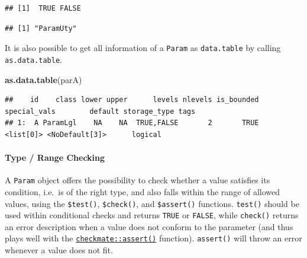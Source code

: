 \documentclass[]{scrbook}
\newenvironment{Shaded}{\begin{snugshade}}{\end{snugshade}}
\newcommand{\KeywordTok}[1]{\textcolor[rgb]{0.13,0.29,0.53}{\textbf{#1}}}
\newcommand{\NormalTok}[1]{#1}
\newcommand{\OperatorTok}[1]{\textcolor[rgb]{0.81,0.36,0.00}{\textbf{#1}}}
\newcommand{\OtherTok}[1]{\textcolor[rgb]{0.56,0.35,0.01}{#1}}
\let\oldparagraph\paragraph
\renewcommand{\paragraph}[1]{\oldparagraph{#1}\mbox{}}
\renewenvironment{Shaded} {\begin{snugshade}\small} {\end{snugshade}}
\begin{document}
\begin{verbatim}
## [1]  TRUE FALSE
\end{verbatim}

\begin{Shaded}
\end{Shaded}

\begin{verbatim}
## [1] "ParamUty"
\end{verbatim}

It is also possible to get all information of a \texttt{Param} as \texttt{data.table} by calling \texttt{as.data.table}.

\begin{Shaded}
\begin{Highlighting}[]
\KeywordTok{as.data.table}\NormalTok{(parA)}
\end{Highlighting}
\end{Shaded}

\begin{verbatim}
##    id    class lower upper      levels nlevels is_bounded special_vals        default storage_type tags
## 1:  A ParamLgl    NA    NA  TRUE,FALSE       2       TRUE    <list[0]> <NoDefault[3]>      logical
\end{verbatim}

\hypertarget{type-range-checking}{%
\paragraph{Type / Range Checking}\label{type-range-checking}}

A \texttt{Param} object offers the possibility to check whether a value satisfies its condition, i.e.~is of the right type, and also falls within the range of allowed values, using the \texttt{\$test()}, \texttt{\$check()}, and \texttt{\$assert()} functions.
\texttt{test()} should be used within conditional checks and returns \texttt{TRUE} or \texttt{FALSE}, while \texttt{check()} returns an error description when a value does not conform to the parameter (and thus plays well with the \href{https://www.rdocumentation.org/packages/checkmate/topics/assert}{\texttt{checkmate::assert()}} function).
\texttt{assert()} will throw an error whenever a value does not fit.

\begin{Shaded}
\end{Shaded}
\end{document}
